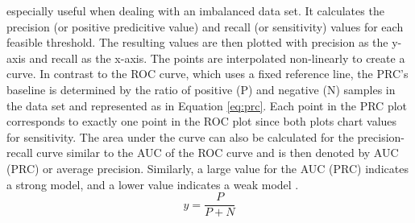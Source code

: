 especially useful when dealing with an imbalanced data set. It calculates the 
precision (or positive predicitive value) and recall (or sensitivity) values 
for each feasible threshold. The 
resulting values are then plotted with precision as the y-axis and 
recall as the x-axis. The points are interpolated non-linearly to 
create a curve. 
In contrast to the ROC curve, which uses a fixed reference line, the PRC's 
baseline is determined by the ratio of positive (P) and negative (N) samples in 
the data set and represented as in Equation \ref{eq:prc}. Each point in the PRC 
plot corresponds to exactly one point in the ROC plot since both plots chart 
values for sensitivity. The area under the curve can also be 
calculated for the precision-recall curve similar to the AUC of the ROC curve 
and is then denoted by AUC (PRC) or average precision. Similarly, a large value 
for the AUC (PRC) indicates a strong model, and a lower value indicates a weak 
model \cite{RN160, RN161}.
\begin{equation}
 y = \frac{P}{P + N}
 \label{eq:prc}
\end{equation}
